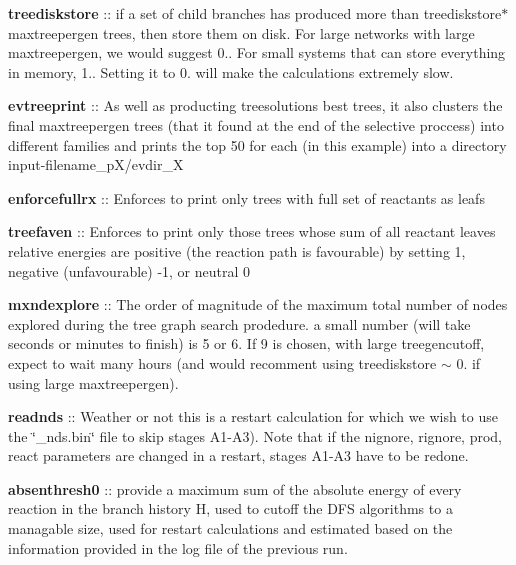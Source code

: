 \begin{DoxyItemize}
\item {\bfseries treediskstore} \+:\+: if a set of child branches has produced more than treediskstore$\ast$maxtreepergen trees, then store them on disk. For large networks with large maxtreepergen, we would suggest 0.. For small systems that can store everything in memory, 1.. Setting it to 0. will make the calculations extremely slow.
\item {\bfseries evtreeprint} \+:\+: As well as producting treesolutions best trees, it also clusters the final maxtreepergen trees (that it found at the end of the selective proccess) into different families and prints the top 50 for each (in this example) into a directory input-\/filename\+\_\+p\+X/evdir\+\_\+X
\item {\bfseries enforcefullrx} \+:\+: Enforces to print only trees with full set of reactants as leafs
\item {\bfseries treefaven} \+:\+: Enforces to print only those trees whose sum of all reactant leaves relative energies are positive (the reaction path is favourable) by setting 1, negative (unfavourable) -\/1, or neutral 0
\item {\bfseries mxndexplore} \+:\+: The order of magnitude of the maximum total number of nodes explored during the tree graph search prodedure. a small number (will take seconds or minutes to finish) is 5 or 6. If 9 is chosen, with large treegencutoff, expect to wait many hours (and would recomment using treediskstore $\sim$ 0. if using large maxtreepergen).
\item {\bfseries readnds} \+:\+: Weather or not this is a restart calculation for which we wish to use the \char`\"{}\+\_\+nds.\+bin\char`\"{} file to skip stages A1-\/\+A3). Note that if the nignore, rignore, prod, react parameters are changed in a restart, stages A1-\/\+A3 have to be redone.
\item {\bfseries absenthresh0} \+:\+: provide a maximum sum of the absolute energy of every reaction in the branch history H, used to cutoff the D\+FS algorithms to a managable size, used for restart calculations and estimated based on the information provided in the log file of the previous run. 
\end{DoxyItemize}